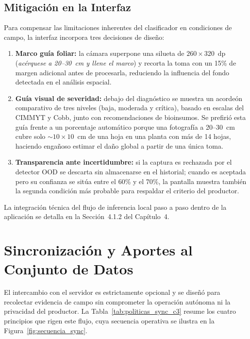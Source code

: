 \subsection{Mitigaci\'on en la Interfaz}
Para compensar las limitaciones inherentes del clasificador en condiciones de campo, la interfaz incorpora tres decisiones de dise\~no:
\begin{enumerate}\setlength{\itemsep}{2pt}
\item \textbf{Marco gu\'ia foliar:} la c\'amara superpone una silueta de $260\times320$~dp (\textit{ac\'erquese a 20--30~cm y llene el marco}) y recorta la toma con un 15\% de margen adicional antes de procesarla, reduciendo la influencia del fondo detectada en el an\'alisis espacial.
\item \textbf{Gu\'ia visual de severidad:} debajo del diagn\'ostico se muestra un acorde\'on comparativo de tres niveles (baja, moderada y cr\'itica), basado en escalas del CIMMYT y Cobb, junto con recomendaciones de bioinsumos. Se prefiri\'o esta gu\'ia frente a un porcentaje autom\'atico porque una fotograf\'ia a 20--30~cm cubre solo ${\sim}10\times10$~cm de una hoja en una planta con m\'as de 14 hojas, haciendo enga\~noso estimar el da\~no global a partir de una \'unica toma.
\item \textbf{Transparencia ante incertidumbre:} si la captura es rechazada por el detector OOD se descarta sin almacenarse en el historial; cuando es aceptada pero su confianza se sit\'ua entre el 60\% y el 70\%, la pantalla muestra tambi\'en la segunda condici\'on m\'as probable para respaldar el criterio del productor.
\end{enumerate}

La integraci\'on t\'ecnica del flujo de inferencia local paso a paso dentro de la aplicaci\'on se detalla en la Secci\'on~4.1.2 del Cap\'itulo~4.

\section{Sincronizaci\'on y Aportes al Conjunto de Datos}

El intercambio con el servidor es estrictamente opcional y se dise\~n\'o para recolectar evidencia de campo sin comprometer la operaci\'on aut\'onoma ni la privacidad del productor. La Tabla~\ref{tab:politicas_sync_c3} resume los cuatro principios que rigen este flujo, cuya secuencia operativa se ilustra en la Figura~\ref{fig:secuencia_sync}.

